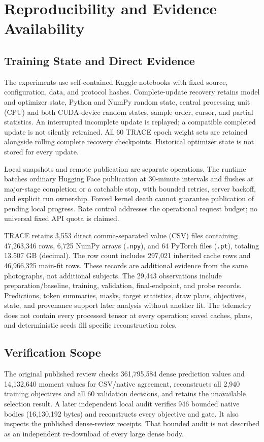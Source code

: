 \section{Reproducibility and Evidence Availability}\label{sec:repro}
\subsection{Training State and Direct Evidence}
The experiments use self-contained Kaggle notebooks with fixed source, configuration, data, and protocol hashes. Complete-update recovery retains model and optimizer state, Python and NumPy random state, central processing unit (CPU) and both CUDA-device random states, sample order, cursor, and partial statistics. An interrupted incomplete update is replayed; a compatible completed update is not silently retrained. All 60 TRACE epoch weight sets are retained alongside rolling complete recovery checkpoints. Historical optimizer state is not stored for every update.\AIdraftingnote

Local snapshots and remote publication are separate operations. The runtime batches ordinary Hugging Face publication at 30-minute intervals and flushes at major-stage completion or a catchable stop, with bounded retries, server backoff, and explicit run ownership. Forced kernel death cannot guarantee publication of pending local progress. Rate control addresses the operational request budget; no universal fixed API quota is claimed.

TRACE retains 3,553 direct comma-separated value (CSV) files containing 47,263,346 rows, 6,725 NumPy arrays (\texttt{.npy}), and 64 PyTorch files (\texttt{.pt}), totaling 13.507 GB (decimal). The row count includes 297,021 inherited cache rows and 46,966,325 main-fit rows. These records are additional evidence from the same photographs, not additional subjects. The 29,443 observations include preparation/baseline, training, validation, final-endpoint, and probe records. Predictions, token summaries, masks, target statistics, draw plans, objectives, state, and provenance support later analysis without another fit. The telemetry does not contain every processed tensor at every operation; saved caches, plans, and deterministic seeds fill specific reconstruction roles.

\subsection{Verification Scope}
The original published review checks 361,795,584 dense prediction values and 14,132,640 moment values for CSV/native agreement, reconstructs all 2,940 training objectives and all 60 validation decisions, and retains the unavailable selection result. A later independent local audit verifies 946 bounded native bodies (16,130,192 bytes) and reconstructs every objective and gate. It also inspects the published dense-review receipts. That bounded audit is not described as an independent re-download of every large dense body.

